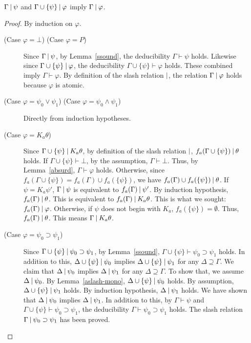 \begin{lemma}
 \label{slash-deduction}
 $\Gamma\mathbin{\mid}\psi$ and $\Gamma\cup\{\psi\}\mathbin{\mid}
 \varphi$ imply $\Gamma\mathbin{\mid}\varphi$.
\end{lemma}
\begin{proof}
 By induction on $\varphi$.
 \begin{description}
  \item[ (Case $\varphi = \bot$) (Case $\varphi = P$)]
	     Since $\Gamma\mathbin{\mid}\psi$, by Lemma~\ref{ssound},
	     the deducibility $\Gamma\vdash\psi$ holds.
	     Likewise since $\Gamma\cup \{\psi\}\mathbin{\mid}\varphi$, the deducibility $\Gamma\cup
	     \{\psi\}\vdash \varphi$ holds.
	     These combined imply $\Gamma\vdash\varphi$.
	     By definition of the slash relation $\mathbin{\mid}$, the relation
	     $\Gamma\mathbin{\mid}\varphi$ holds because $\varphi$ is
	     atomic. 
  \item[ (Case $\varphi = \psi_0\vee\psi_1$) (Case $\varphi =\psi_0\wedge\psi_1$)]
	     Directly from induction hypotheses.
  \item[ (Case $\varphi = K_a\theta$)]
	     Since $\Gamma\cup\{\psi\}\mathbin{\mid} K_a\theta$, by definition of the slash
	     relation $\mathbin{\mid}$,
	     $f_a(\Gamma\cup\{\psi\})\mathbin{\mid} \theta$ holds.
	     If $\Gamma\cup\{\psi\}\vdash\bot$, by the assumption,
	     $\Gamma\vdash\bot$. Thus, by Lemma~\ref{absurd}, $\Gamma\vdash\varphi$ holds.
	     Otherwise, since $f_a(\Gamma\cup\{\psi\}) = f_a(\Gamma)\cup f_a(\{\psi\})$,
	     we have $f_a(\Gamma)\cup f_a(\{\psi\})\mathbin{\mid} \theta$.
	     If $\psi = K_a\psi'$,
	     $\Gamma\mathbin{\mid}\psi$ is equivalent to $f_a(\Gamma)\mathbin{\mid} \psi'$.
	     By induction hypothesis, $f_a(\Gamma)\mathbin{\mid}\theta$.
	     This is equivalent to $f_a(\Gamma)\mathbin{\mid} K_a\theta$.
	     This is what we sought: $f_a(\Gamma)\mathbin{\mid}\varphi$.
	     Otherwise, if $\psi$ does not begin with $K_a$,
	     $f_a(\{\psi\}) = \emptyset$.
	     Thus, $f_a(\Gamma)\mathbin{\mid}\theta$.
	     This means $\Gamma \mathbin{\mid} K_a\theta$.
  \item[ (Case $\varphi = \psi_0\supset\psi_1$)]
	     Since $\Gamma\cup\{\psi\}\mathbin{\mid} \psi_0\supset\psi_1$,
	     by Lemma~\ref{ssound},
	     $\Gamma\cup\{\psi\}\vdash\psi_0\supset \psi_1$ holds.
	     In addition to this,
	     $\Delta\cup\{\psi\}\mathbin{\mid} \psi_0$ implies
	     $\Delta\cup\{\psi\}\mathbin{\mid} \psi_1$ for any $\Delta\supseteq \Gamma$.
	     We claim that $\Delta\mathbin{\mid} \psi_0$ implies $\Delta\mathbin{\mid} \psi_1$ for any
	     $\Delta\supseteq \Gamma$.
	     To show that, we assume $\Delta\mathbin{\mid}\psi_0$.
	     By Lemma~\ref{aslash-mono},
	     $\Delta\cup\{\psi\}\mathbin{\mid} \psi_0$ holds.
	     By assumption, $\Delta\cup\{\psi\}\mathbin{\mid}\psi_1$ holds.
	     By induction hypothesis, $\Delta\mathbin{\mid}\psi_1$ holds.
	     We have shown that 
	     $\Delta\mathbin{\mid} \psi_0$ implies $\Delta\mathbin{\mid} \psi_1$.
	     In addition to this, by $\Gamma\vdash\psi$ and
	     $\Gamma\cup\{\psi\}\vdash\psi_0\supset\psi_1$, the deducibility
	     $\Gamma\vdash\psi_0\supset \psi_1$ holds.
	     The slash relation $\Gamma\mathbin{\mid}\psi_0\supset \psi_1$ has been proved.
 \end{description}
\end{proof}

